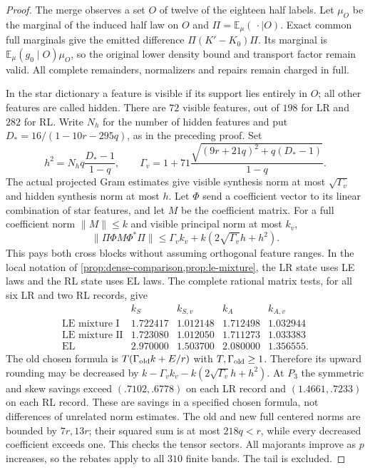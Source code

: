 \begin{proof}
The merge observes a set $O$ of twelve of the eighteen half labels.
Let $\mu_O$ be the marginal of the induced half law on $O$ and
$\Pi=\mathbb E_\mu(\,\cdot\mid O)$. Exact common full marginals give
the emitted difference $\Pi(K'-K_0)\Pi$. Its marginal is
$\mathbb E_\mu(g_0\mid O)\mu_O$, so the original lower density bound
and transport factor remain valid. All complete remainders, normalizers
and repairs remain charged in full.

In the star dictionary a feature is visible if its support lies
entirely in $O$; all other features are called hidden. There are
$72$ visible features, out of $198$ for LR and $282$ for RL.
Write $N_h$ for the number of hidden features and put
$D_*=16/(1-10r-295q)$, as in the preceding proof. Set
\[
 h^2=N_hq\frac{D_*-1}{1-q},\qquad
 \Gamma_v=1+71\frac{\sqrt{(9r+21q)^2+q(D_*-1)}}{1-q}.
\]
The actual projected Gram estimates give visible synthesis norm at
most $\sqrt{\Gamma_v}$ and hidden synthesis norm at most $h$.
Let $\Phi$ send a coefficient vector to its linear combination of
star features, and let $M$ be the coefficient matrix.
For a full coefficient norm $\|M\|\le k$ and visible principal norm
at most $k_v$,
\[
 \|\Pi\Phi M\Phi^*\Pi\|\le
 \Gamma_vk_v+k(2\sqrt{\Gamma_v}h+h^2).
\]
This pays both cross blocks without assuming orthogonal feature ranges.
In the local notation of \cref{prop:dense-comparison,prop:le-mixture},
the LR state uses LE laws and the RL state uses EL laws.
The complete rational matrix tests, for all six LR and two RL records, give
\[
\begin{array}{c|cc|cc}
 &k_S&k_{S,v}&k_A&k_{A,v}\\ \hline
\text{LE mixture I}&1.722417&1.012148&1.712498&1.032944\\
\text{LE mixture II}&1.723080&1.012050&1.711273&1.033383\\
\text{EL}&2.970000&1.503700&2.080000&1.356555.
\end{array}
\]
The old chosen formula is $T(\Gamma_{\rm old}k+E/r)$ with
$T,\Gamma_{\rm old}\ge1$. Therefore its upward rounding may be
decreased by
$k-\Gamma_vk_v-k(2\sqrt{\Gamma_v}h+h^2)$.
At $P_3$ the symmetric and skew savings exceed
$(.7102,.6778)$ on each LR record and $(1.4661,.7233)$ on each
RL record. These are savings in a specified
chosen formula, not differences of unrelated norm estimates.
The old and new full centered norms are bounded by $7r,13r$;
their squared sum is at most $218q<r$, while every decreased
coefficient exceeds one. This checks the tensor sectors.
All majorants improve as $p$ increases, so the rebates apply to
all $310$ finite bands. The tail is excluded.
\end{proof}
